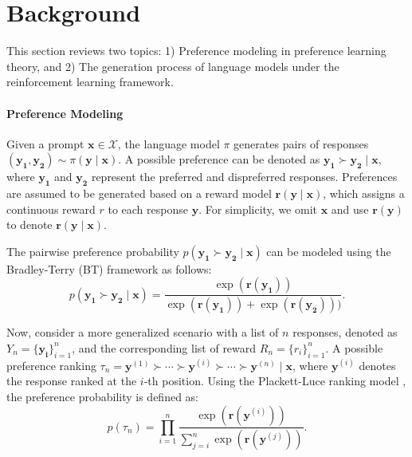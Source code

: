 
\section{Background}
This section reviews two topics: 1) Preference modeling in preference learning theory, and 2) The generation process of language models under the reinforcement learning framework. 

\paragraph{Preference Modeling}
Given a prompt $\boldsymbol{x} \in \mathcal{X}$, the language model $\pi$ generates pairs of responses $(\boldsymbol{y_1}, \boldsymbol{y_2}) \sim \pi(\boldsymbol{y} \mid \boldsymbol{x})$. 
A possible preference can be denoted as $\boldsymbol{y_1} \succ \boldsymbol{y_2} \mid \boldsymbol{x}$, where $\boldsymbol{y_1}$ and $\boldsymbol{y_2}$ represent the preferred and dispreferred responses. 
Preferences are assumed to be generated based on a reward model $\boldsymbol{r}(\boldsymbol{y} \mid \boldsymbol{x})$, which assigns a continuous reward $r$ to each response $\boldsymbol{y}$.
For simplicity, we omit $\boldsymbol{x}$ and use $\boldsymbol{r}(\boldsymbol{y})$ to denote $\boldsymbol{r}(\boldsymbol{y} \mid \boldsymbol{x})$.

The pairwise preference probability $p(\boldsymbol{y_1} \succ \boldsymbol{y_2} \mid \boldsymbol{x})$ can be modeled using the Bradley-Terry (BT) framework \citep{bradley-etal-1952-rank} as follows:
\begin{equation}
\label{eq:bt}
    p(\boldsymbol{y_1} \succ \boldsymbol{y_2} \mid \boldsymbol{x}) = \frac{\exp(\boldsymbol{r}(\boldsymbol{y_1}))}{\exp(\boldsymbol{r}(\boldsymbol{y_1})) + \exp(\boldsymbol{r}(\boldsymbol{y_2})))}.
\end{equation}

Now, consider a more generalized scenario with a list of $n$ responses, denoted as $Y_n = \{\boldsymbol{y_i}\}_{i=1}^n$, and the corresponding list of reward $R_n = \{r_i\}_{i=1}^n$. A possible preference ranking $\tau_n = \boldsymbol{y}^{(1)} \succ \cdots \succ \boldsymbol{y}^{(i)} \succ \cdots \succ \boldsymbol{y}^{(n)} \mid \boldsymbol{x}$, where $\boldsymbol{y}^{(i)}$ denotes the response ranked at the $i$-th position. Using the Plackett-Luce ranking model \citep{plackett-1975-permutation, luce-2012-individual}, the preference probability is defined as:
\begin{equation}
\label{eq:pl}
    p(\tau_n) = \prod_{i=1}^{n} \frac{\exp(\boldsymbol{r}(\boldsymbol{y}^{(i)}))}{\sum_{j=i}^{n} \exp(\boldsymbol{r}(\boldsymbol{y}^{(j)}))}.
\end{equation}

